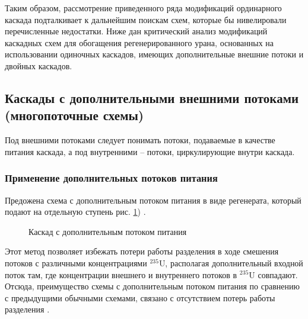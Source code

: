 Таким образом, рассмотрение приведенного ряда модификаций ординарного каскада подталкивает к дальнейшим поискам схем, которые бы нивелировали перечисленные недостатки.
Ниже дан критический анализ модификаций каскадных схем для обогащения регенерированного урана, основанных на использовании одиночных каскадов, имеющих дополнительные внешние потоки и двойных каскадов.

\subsection{Каскады с дополнительными внешними потоками (многопоточные схемы)}

Под внешними потоками следует понимать потоки, подаваемые в качестве питания каскада, а под внутренними -- потоки, циркулирующие внутри каскада. 

\subsubsection{Применение дополнительных потоков питания}

Предожена схема с дополнительным потоком питания в виде регенерата, который подают на отдельную ступень рис. \ref{fig:2_inputs}) \cite{sulaberidzeQuasiidealCascadesAdditional2006}.
\begin{figure}[ht]
  \caption{Каскад с дополнительным потоком питания}\label{fig:2_inputs}
\end{figure}

Этот метод позволяет избежать потери работы разделения в ходе смешения потоков с различными концентрациями $^{235}$U, располагая дополнительный входной поток там, где концентрации внешнего и внутреннего потоков в $^{235}$U совпадают.
Отсюда, преимущество схемы с дополнительным потоком питания по сравнению с предыдущими обычными схемами, связано с отсутствием потерь работы разделения \cite{smirnovKaskadnyeShemyZadachah2012, sulaberidzeQuasiidealCascadesAdditional2006}.

